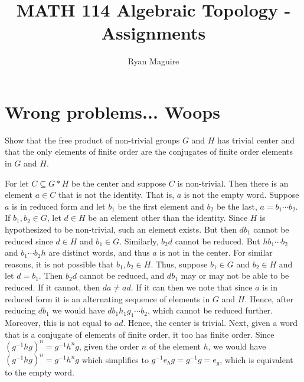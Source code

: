 \documentclass{article}                                                        %
\begin{document}
    \title{MATH 114 Algebraic Topology - Assignments}
    \author{Ryan Maguire}
    \date{\vspace{-5ex}}
    \maketitle
    \setcounter{section}{2}
\section{Wrong problems... Woops}
    \begin{problem}
        Show that the free product of non-trivial groups $G$ and $H$ has trivial
        center and that the only elements of finite order are the conjugates
        of finite order elements in $G$ and $H$.
    \end{problem}
    \begin{solution}
        For let $C\subseteq{G}*H$ be the center and suppose $C$ is non-trivial.
        Then there is an element $a\in{C}$ that is not the identity. That is,
        $a$ is not the empty word. Suppose $a$ is in reduced form and let
        $b_{1}$ be the first element and $b_{2}$ be the last,
        $a=b_{1}\cdots{b}_{2}$. If
        $b_{1},b_{2}\in{G}$, let $d\in{H}$ be an element other than the
        identity. Since $H$ is hypothesized to be non-trivial, such an element
        exists. But then $db_{1}$ cannot be reduced since $d\in{H}$ and
        $b_{1}\in{G}$. Similarly, $b_{2}d$ cannot be reduced. But
        $hb_{1}\cdots{b}_{2}$ and $b_{1}\cdots{b}_{2}h$ are distinct words, and
        thus $a$ is not in the center. For similar reasons, it is not possible
        that $b_{1},b_{2}\in{H}$. Thus, suppose $b_{1}\in{G}$ and $b_{2}\in{H}$
        and let $d=b_{1}$. Then $b_{2}d$ cannot be reduced, and $db_{1}$ may or
        may not be able to be reduced. If it cannot, then $da\ne{ad}$. If it can
        then we note that since $a$ is in reduced form it is an alternating
        sequence of elements in $G$ and $H$. Hence, after reducing $db_{1}$ we
        would have $db_{1}h_{1}g_{1}\cdots{b}_{2}$, which cannot be reduced
        further. Moreover, this is not equal to $ad$. Hence, the center is
        trivial. Next, given a word that is a conjugate of elements of finite
        order, it too has finite order. Since
        $(g^{\minus{1}}hg)^{n}=g^{\minus{1}}h^{n}g$, given the order $n$ of the
        element $h$, we would have $(g^{\minus{1}}hg)^{n}=g^{\minus{1}}h^{n}g$
        which simplifies to $g^{\minus{1}}e_{h}g=g^{\minus{1}}g=e_{g}$,
        which is equivalent to the empty word.
    \end{solution}
\end{document}
